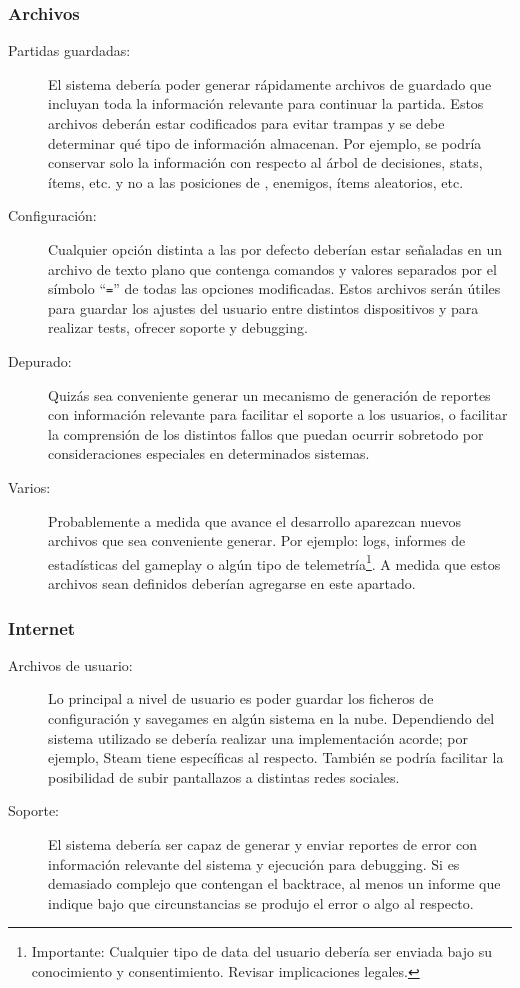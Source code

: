 \subsubsection{Archivos}\label{io:output-archivos}
\begin{description}
\item[Partidas guardadas:] El sistema debería poder generar rápidamente archivos de guardado que incluyan toda la información relevante para continuar la partida. Estos archivos deberán estar codificados para evitar trampas y se debe determinar qué tipo de información almacenan. Por ejemplo, se podría conservar solo la información con respecto al árbol de decisiones, stats, ítems, etc. y no a las posiciones de , enemigos, ítems aleatorios, etc.

\item[Configuración:] Cualquier opción distinta a las por defecto deberían estar señaladas en un archivo de texto plano que contenga comandos y valores separados por el símbolo “\texttt{=}” de todas las opciones modificadas.
Estos archivos serán útiles para guardar los ajustes del usuario entre distintos dispositivos y para realizar tests, ofrecer soporte y debugging.

\item[Depurado:] Quizás sea conveniente generar un mecanismo de generación de reportes con información relevante para facilitar el soporte a los usuarios, o facilitar la comprensión de los distintos fallos que puedan ocurrir sobretodo por consideraciones especiales en determinados sistemas.

\item[Varios:] Probablemente a medida que avance el desarrollo aparezcan nuevos archivos que sea conveniente generar. Por ejemplo: logs, informes de estadísticas del gameplay o algún tipo de telemetría\footnote{Importante: Cualquier tipo de data del usuario debería ser enviada bajo su conocimiento y consentimiento. Revisar implicaciones legales.}. A medida que estos archivos sean definidos deberían agregarse en este apartado.
\end{description}

\subsubsection{Internet}\label{io:output-internet}
\begin{description}
\item[Archivos de usuario:] Lo principal a nivel de usuario es poder guardar los ficheros de configuración y savegames en algún sistema en la nube. Dependiendo del sistema utilizado se debería realizar una implementación acorde; por ejemplo, Steam tiene  específicas al respecto. También se podría facilitar la posibilidad de subir pantallazos a distintas redes sociales.

\item[Soporte:] El sistema debería ser capaz de generar y enviar reportes de error con información relevante del sistema y ejecución para debugging. Si es demasiado complejo que contengan el backtrace, al menos un informe que indique bajo que circunstancias se produjo el error o algo al respecto.
\end{description}

